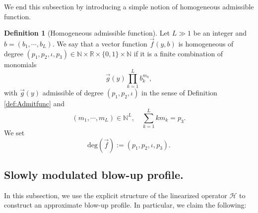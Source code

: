 \documentclass[11pt]{aims}
\theoremstyle{definition}
\newtheorem{definition}[theorem]{Definition}
\numberwithin{equation}{section}
\begin{document}
We end this subsection by introducing a simple notion of homogeneous admissible function.
\begin{definition}[Homogeneous admissible function] Let $L \gg 1$ be an integer and $b = (b_1, \cdots, b_L)$. We say that a vector function $\vec f(y,b)$ is homogeneous of degree $(p_1, p_2, \iota, p_3) \in \mathbb{N} \times \mathbb{\mathbb{R}}\times \{0,1\} \times \mathbb{N}$ if it is a finite combination of monomials
$$\vec{g}(y)\prod_{k = 1}^Lb_k^{m_k},$$
with $\vec{g}(y)$ admissible of degree $(p_1, p_2, \iota)$ in the sense of Definition \ref{def:Admitfunc} and
$$(m_1, \cdots, m_L) \in \mathbb{N}^L, \quad\sum_{k = 1}^L km_k = p_3.$$
We set 
$$\text{deg}(\vec f):= (p_1, p_2, \iota, p_3).$$  
\end{definition}

\subsection{Slowly modulated blow-up profile.}
In this subsection, we use the explicit structure of the linearized operator ${\mathscr{H}}$ to construct an approximate blow-up profile. In particular, we claim the following:
\end{document}
